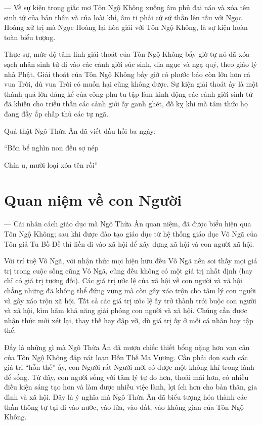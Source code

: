 — Về sự kiện trong giấc mơ Tôn Ngộ Không xuống âm phủ đại náo và xóa tên sinh tử của bản thân và của loài khỉ, âm ti phải cử sứ thần lên tấu với Ngọc Hoàng xử trị mà Ngọc Hoàng lại hòa giải với Tôn Ngộ Không, là sự kiện hoàn toàn biểu tượng.

Thực sự, mức độ tâm linh giải thoát của Tôn Ngộ Không bấy giờ tự nó đã xóa sạch nhân sinh tử đi vào các cảnh giới súc sinh, địa ngục và ngạ quỷ, theo giáo lý nhà Phật. Giải thoát của Tôn Ngộ Không bấy giờ có phước báo còn lớn hơn cả vua Trời, dù vua Trời có muốn hại cũng không được. Sự kiện giải thoát ấy là một thành quả lớn đáng kể của công phu tu tập làm kinh động các cảnh giới sinh tử đã khiến cho triều thần các cảnh giới ấy ganh ghét, đố kỵ khi mà tâm thức họ đang đầy ắp chấp thủ các tự ngã.

Quả thật Ngô Thừa Ân đã viết đầu hồi ba ngày:

\begin{itshape}
``Bốn bể nghìn non đều sợ nép

Chín u, mười loại xóa tên rồi''
\end{itshape}


\section{Quan niệm về con Người} %
\label{sec:3_quan_niem_con_nguoi}

— Cái nhân cách giáo dục mà Ngô Thừa Ân quan niệm, đã được biểu hiện qua Tôn Ngộ Không; sau khi được đào tạo giáo dục từ hệ thống giáo dục Vô Ngã của Tôn giả Tu Bồ Đề thì liền đi vào xã hội để xây dựng xã hội và con người xã hội.

Với trí tuệ Vô Ngã, với nhận thức mọi hiện hữu đều Vô Ngã nên soi thấy mọi giá trị trong cuộc sống cũng Vô Ngã, cũng đều không có một giá trị nhất định (hay chỉ có giá trị tương đối). Các giá trị ước lệ của xã hội về con người và xã hội chẳng những đã không thể đứng vững mà còn gây xáo trộn cho tâm lý con người và gây xáo trộn xã hội. Tất cả các giá trị ước lệ ấy trở thành trói buộc con người và xã hội, kìm hãm khả năng giải phóng con người và xã hội. Chúng cần được nhận thức mới xét lại, thay thế hay đập vỡ, dù giá trị ấy ở mỗi cá nhân hay tập thể.

Đấy là những gì mà Ngô Thừa Ân đã mượn chiếc thiết bổng nặng hơn vạn cân của Tôn Ngộ Không đập nát loạn Hỗn Thế Ma Vương. Cần phải dọn sạch các giá trị ``hỗn thế'' ấy, con Người rất Người mới có được một không khí trong lành để sống. Từ đây, con người sống với tâm lý tự do hơn, thoải mái hơn, có nhiều điều kiện sáng tạo hơn và làm được nhiều việc lành, lợi ích hơn cho bản thân, gia đình và xã hội. Đây là ý nghĩa mà Ngô Thừa Ân đã biểu tượng hóa thành các thần thông tự tại đi vào nước, vào lửa, vào đất, vào không gian của Tôn Ngộ Không.


